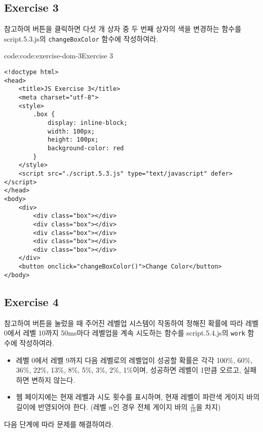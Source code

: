 \subsection*{Exercise 3}

\을 참고하여 버튼을 클릭하면 다섯 개 상자 중 두 번째 상자의 색을 변경하는 함수를 script.5.3.js의 \texttt{changeBoxColor} 함수에 작성하여라.

\begin{codeenv}{code:code:exercise-dom-3}{Exercise 3}\begin{verbatim}
<!doctype html>
<head>
    <title>JS Exercise 3</title>
    <meta charset="utf-8">
    <style>
        .box { 
            display: inline-block; 
            width: 100px; 
            height: 100px; 
            background-color: red 
        }
    </style>
    <script src="./script.5.3.js" type="text/javascript" defer></script>
</head>
<body>
    <div>
        <div class="box"></div>
        <div class="box"></div>
        <div class="box"></div>
        <div class="box"></div>
        <div class="box"></div>
    </div>
    <button onclick="changeBoxColor()">Change Color</button>
</body>
\end{verbatim}
\end{codeenv}

\subsection*{Exercise 4}

\을 참고하여 버튼을 눌렀을 때 주어진 레벨업 시스템이 작동하여 정해진 확률에 따라 레벨 0에서 레벨 10까지 50ms마다 레벨업을 계속 시도하는 함수를 script.5.4.js의 \texttt{work} 함수에 작성하여라.

\begin{itemize}
    \item 레벨 0에서 레벨 9까지 다음 레벨로의 레벨업이 성공할 확률은 각각 100\%, 60\%, 36\%, 22\%, 13\%, 8\%, 5\%, 3\%, 2\%, 1\%이며, 성공하면 레벨이 1만큼 오르고, 실패하면 변하지 않는다.
    \item 웹 페이지에는 현재 레벨과 시도 횟수를 표시하며, 현재 레벨이 파란색 게이지 바의 길이에 반영되어야 한다.  (레벨 $n$인 경우 전체 게이지 바의 $\frac n {10}$을 차지)
\end{itemize}

다음 단계에 따라 문제를 해결하여라.

